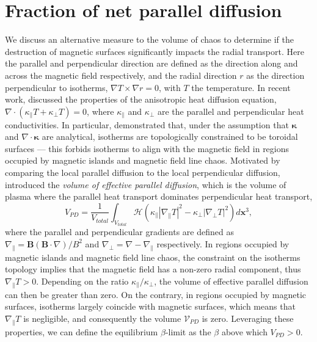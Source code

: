 \documentclass[my_thesis.tex]{subfiles}
\begin{document}
\section{Fraction of net parallel diffusion}\label{sec.fraction parallel diffusion}
We discuss an alternative measure to the volume of chaos to determine if the destruction of magnetic surfaces significantly impacts the radial transport. Here the parallel and perpendicular direction are defined as the direction along and across the magnetic field respectively, and the radial  direction $r$ as the direction perpendicular to isotherms, $\nabla T\times\nabla r=0$, with $T$ the temperature. In recent work, \citet{paulHeatConductionIrregular2022} discussed the properties of the anisotropic heat diffusion equation, $\nabla\cdot(\kappa_\parallel T + \kappa_\perp T)=0$, where $\kappa_\parallel$ and $\kappa_\perp$ are the parallel and perpendicular heat conductivities. In particular, \citeauthor{paulHeatConductionIrregular2022} demonstrated that, under the assumption that $\boldsymbol{\kappa}$ and $\nabla\cdot\boldsymbol{\kappa}$ are analytical, isotherms are topologically constrained to be toroidal surfaces --- this forbids isotherms to align with the magnetic field in regions occupied by magnetic islands and magnetic field line chaos. Motivated by comparing the local parallel diffusion to the local perpendicular diffusion, \citeauthor{paulHeatConductionIrregular2022} introduced the \emph{volume of effective parallel diffusion}, which is the volume of plasma where the parallel heat transport dominates perpendicular heat transport,
\begin{equation}
V_{PD} = \frac{1}{V_{total}} \int_{V_{total}}\mathcal{H}(\kappa_\parallel|\nabla_\parallel T|^2-\kappa_\perp|\nabla_\perp T|^2) d\mathbf{x}^3, \label{eq.paul_volume_effective_diffusion}
\end{equation}
where the parallel and perpendicular gradients are defined as $\nabla_\parallel=\mathbf{B}(\mathbf{B}\cdot\nabla) / B^2$ and $\nabla_\perp=\nabla-\nabla_\parallel$ respectively. In regions occupied by magnetic islands and magnetic field line chaos, the constraint on the isotherms topology implies that the magnetic field has a non-zero radial component, thus $\nabla_\parallel T> 0$. Depending on the ratio $\kappa_\parallel / \kappa_\perp$, the volume of effective parallel diffusion can then be greater than zero. On the contrary, in regions occupied by magnetic surfaces, isotherms largely coincide with magnetic surfaces, which means that $\nabla_\parallel T$ is negligible, and consequently the volume $\mathcal{V}_{PD}$ is zero. Leveraging these properties, we can define the equilibrium $\beta$-limit as the $\beta$ above which $V_{PD}>0$.
\end{document}
